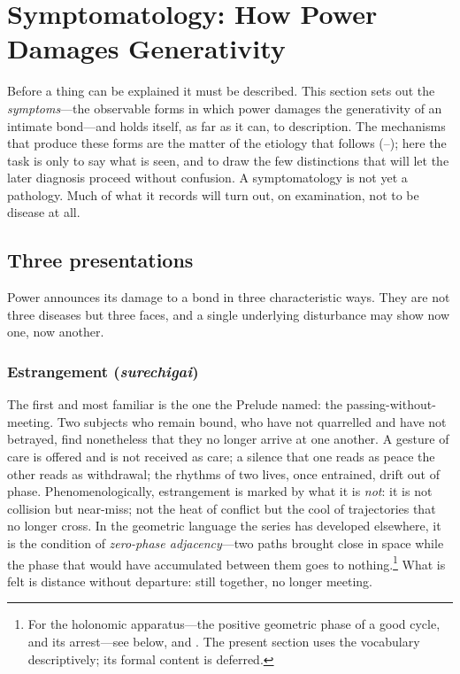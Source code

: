 \section{Symptomatology: How Power Damages Generativity}
\label{p17:sec:symptom}

\noindent
Before a thing can be explained it must be described. This section sets out the \emph{symptoms}---the observable forms in which power damages the generativity of an intimate bond---and holds itself, as far as it can, to description. The mechanisms that produce these forms are the matter of the etiology that follows (--); here the task is only to say what is seen, and to draw the few distinctions that will let the later diagnosis proceed without confusion. A symptomatology is not yet a pathology. Much of what it records will turn out, on examination, not to be disease at all.

\subsection{Three presentations}
\label{p17:sub:symptom-three}

Power announces its damage to a bond in three characteristic ways. They are not three diseases but three faces, and a single underlying disturbance may show now one, now another.

\subsubsection{Estrangement (\emph{surechigai})}

The first and most familiar is the one the Prelude named: the passing-without-meeting. Two subjects who remain bound, who have not quarrelled and have not betrayed, find nonetheless that they no longer arrive at one another. A gesture of care is offered and is not received as care; a silence that one reads as peace the other reads as withdrawal; the rhythms of two lives, once entrained, drift out of phase. Phenomenologically, estrangement is marked by what it is \emph{not}: it is not collision but near-miss; not the heat of conflict but the cool of trajectories that no longer cross. In the geometric language the series has developed elsewhere, it is the condition of \emph{zero-phase adjacency}---two paths brought close in space while the phase that would have accumulated between them goes to nothing.\footnote{For the holonomic apparatus---the positive geometric phase of a good cycle, and its arrest---see  below, and \textcite{paperix}. The present section uses the vocabulary descriptively; its formal content is deferred.} What is felt is distance without departure: still together, no longer meeting.

